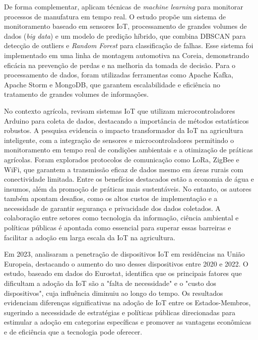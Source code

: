 \documentclass[12pt, a4paper]{article}
\begin{document}
De forma complementar, \cite{Syafrudin2018} aplicam técnicas de \textit{machine learning} para monitorar processos de
manufatura em tempo real. O estudo propõe um sistema de monitoramento baseado em sensores IoT, processamento de grandes
volumes de dados (\textit{big data}) e um modelo de predição híbrido, que combina DBSCAN para detecção de outliers e
\textit{Random Forest} para classificação de falhas. Esse sistema foi implementado em uma linha de montagem automotiva
na Coreia, demonstrando eficácia na prevenção de perdas e na melhoria da tomada de decisão. Para o processamento de
dados, foram utilizadas ferramentas como Apache Kafka, Apache Storm e MongoDB, que garantem escalabilidade e eficiência
no tratamento de grandes volumes de informações.

No contexto agrícola, \cite{narayan2024} revisam sistemas IoT que utilizam microcontroladores Arduino para coleta de
dados, destacando a importância de métodos estatísticos robustos. A pesquisa evidencia o impacto transformador da IoT na
agricultura inteligente, com a integração de sensores e microcontroladores permitindo o monitoramento em tempo real de
condições ambientais e a otimização de práticas agrícolas. Foram explorados protocolos de comunicação como LoRa, ZigBee
e WiFi, que garantem a transmissão eficaz de dados mesmo em áreas rurais com conectividade limitada. Entre os benefícios
destacados estão a economia de água e insumos, além da promoção de práticas mais sustentáveis. No entanto, os autores
também apontam desafios, como os altos custos de implementação e a necessidade de garantir segurança e privacidade dos
dados coletados. A colaboração entre setores como tecnologia da informação, ciência ambiental e políticas públicas é
apontada como essencial para superar essas barreiras e facilitar a adoção em larga escala da IoT na agricultura.

Em 2023, \cite{pica2023} analisaram a penetração de dispositivos IoT em residências na União Europeia, destacando o
aumento do uso desses dispositivos entre 2020 e 2022. O estudo, baseado em dados do Eurostat, identifica que os
principais fatores que dificultam a adoção da IoT são a "falta de necessidade" e o "custo dos dispositivos", cuja
influência diminuiu ao longo do tempo. Os resultados evidenciam diferenças significativas na adoção de IoT entre os
Estados-Membros, sugerindo a necessidade de estratégias e políticas públicas direcionadas para estimular a adoção em
categorias específicas e promover as vantagens econômicas e de eficiência que a tecnologia pode oferecer.
\end{document}
